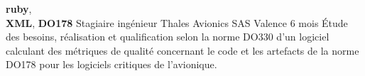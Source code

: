 \documentclass[11pt,a4paper]{moderncv}
\begin{document}
  \cventry
    {\textbf{ruby}, \\ \textbf{XML}, \textbf{DO178}}
    {Stagiaire ingénieur}
    {Thales Avionics SAS}
    {Valence}
    {6 mois}{
      Étude des besoins, réalisation et qualification selon la norme DO330
      d'un logiciel calculant des métriques de qualité concernant le code et
      les artefacts de la norme DO178 pour les logiciels critiques de
      l'avionique.
    }







\end{document}
